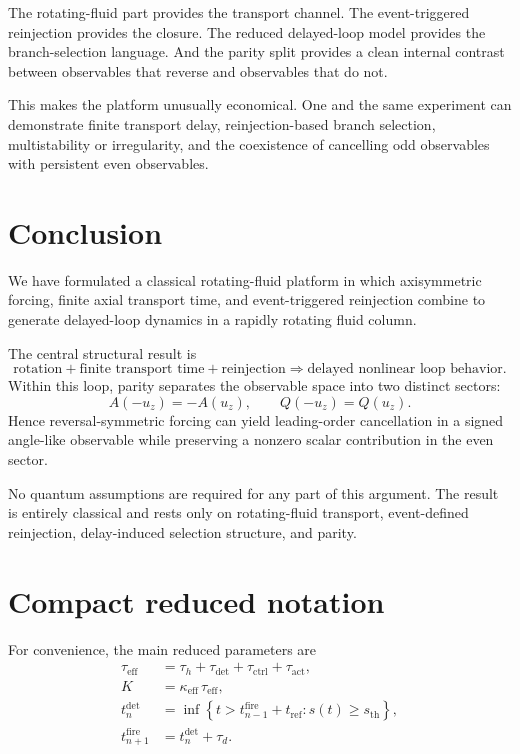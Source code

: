 \documentclass[11pt,a4paper]{article}
\begin{document}
The rotating-fluid part provides the transport channel. The event-triggered reinjection provides the closure. The reduced delayed-loop model provides the branch-selection language. And the parity split provides a clean internal contrast between observables that reverse and observables that do not.

This makes the platform unusually economical. One and the same experiment can demonstrate finite transport delay, reinjection-based branch selection, multistability or irregularity, and the coexistence of cancelling odd observables with persistent even observables.

\section{Conclusion}

We have formulated a classical rotating-fluid platform in which axisymmetric forcing, finite axial transport time, and event-triggered reinjection combine to generate delayed-loop dynamics in a rapidly rotating fluid column.

The central structural result is
\begin{equation}
\text{rotation} + \text{finite transport time} + \text{reinjection}
\Longrightarrow
\text{delayed nonlinear loop behavior}.
\end{equation}
Within this loop, parity separates the observable space into two distinct sectors:
\begin{equation}
A(-u_z)=-A(u_z),
\qquad
Q(-u_z)=Q(u_z).
\end{equation}
Hence reversal-symmetric forcing can yield leading-order cancellation in a signed angle-like observable while preserving a nonzero scalar contribution in the even sector.

No quantum assumptions are required for any part of this argument. The result is entirely classical and rests only on rotating-fluid transport, event-defined reinjection, delay-induced selection structure, and parity.

\appendix

\section{Compact reduced notation}

For convenience, the main reduced parameters are
\begin{align}
\tau_{\mathrm{eff}}
&=
\tau_h + \tau_{\mathrm{det}} + \tau_{\mathrm{ctrl}} + \tau_{\mathrm{act}},
\\
K
&=
\kappa_{\mathrm{eff}}\,\tau_{\mathrm{eff}},
\\
t_n^{\mathrm{det}}
&=
\inf\left\{
t>t_{n-1}^{\mathrm{fire}}+t_{\mathrm{ref}}
:
s(t)\ge s_{\mathrm{th}}
\right\},
\\
t_{n+1}^{\mathrm{fire}}
&=
t_n^{\mathrm{det}}+\tau_d.
\end{align}
\end{document}
